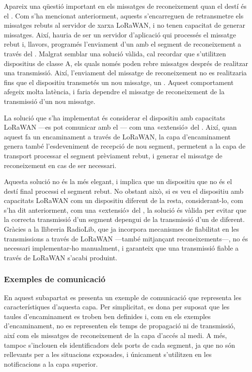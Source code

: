 \documentclass{tfgitic}[2024/07/01]
\begin{document}
{Apareix una qüestió important en els missatges de reconeixement quan el destí és el . Com s'ha mencionat anteriorment, aquests s'encarreguen de retransmetre els missatges rebuts al servidor de xarxa LoRaWAN, i no tenen capacitat de generar missatges. Així, hauria de ser un servidor d'aplicació qui processés el missatge rebut i, llavors, programés l'enviament d'un  amb el segment de reconeixement a través del .
Malgrat semblar una solució vàlida, cal recordar que s'utilitzen dispositius de classe A, els quals només poden rebre missatges després de realitzar una transmissió. Així, l'enviament del missatge de reconeixement no es realitzaria fins que el dispositiu transmetés un nou missatge, un . Aquest comportament afegeix molta latència, i faria dependre el missatge de reconeixement de la transmissió d'un nou missatge.

La solució que s'ha implementat és considerar el dispositiu amb capacitats LoRaWAN ---es pot comunicar amb el --- com una «extensió» del . Així, quan aquest fa un encaminament a través de LoRaWAN, la capa d'encaminament genera també l'esdeveniment de recepció de nou segment, permetent a la capa de transport processar el segment prèviament rebut, i generar el missatge de reconeixement en cas de ser necessari.

Aquesta solució no és la més elegant, i implica que un dispositiu que no és el destí final processi el segment rebut. No obstant això, si es veu el dispositiu amb capacitats LoRaWAN com un dispositiu diferent de la resta, considerant-lo, com s'ha dit anteriorment, com una «extensió» del , la solució és vàlida per evitar que la correcta transmissió d'un segment depengui de la transmissió d'un de diferent. Gràcies a la llibreria RadioLib, que ja incorpora mecanismes de fiabilitat en les transmissions a través de LoRaWAN ---també mitjançant reconeixements---, no és necessari implementar-ho manualment, i garanteix que una transmissió fiable a través de LoRaWAN s’acabi produint.

\subsubsection{Exemples de comunicació}
En aquest subapartat es presenta un exemple de comunicació que representa les característiques d'aquesta capa. Per simplicitat, es dona per suposat que les taules d'encaminament es troben ben definides i, com en els exemples d'encaminament, no es representen els temps de propagació ni de transmissió, així com els missatges de reconeixement de la capa d'accés al medi. A més, tampoc s'inclouen els identificadors dels ports de cada segment, ja que no són rellevants per a les situacions exposades, i únicament s'utilitzen en les notificacions a la capa superior.

}
\end{document}
